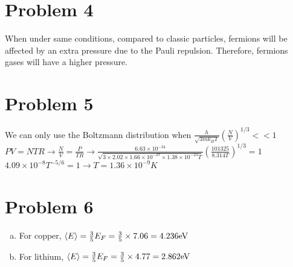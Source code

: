 \documentclass[a4paper]{article}
\begin{document}
\section{Problem 4}
\noindent When under same conditions, compared to classic particles, fermions will be affected by an extra pressure due to the Pauli repulsion. Therefore, fermions gases will have a higher pressure.
\section{Problem 5}
We can only use the Boltzmann distribution when $\frac{h}{\sqrt{3mk_BT}}(\frac{N}{V})^{1/3}<<1$
\\$PV=NTR\rightarrow\frac{N}{V}=\frac{P}{TR}\rightarrow\frac{6.63\times10^{-34}}{\sqrt{3\times2.02\times1.66\times10^{-27}\times1.38\times10^{-23}T}}(\frac{101325}{8.314T})^{1/3}=1$
\\$4.09\times10^{-8}T^{-5/6}=1\rightarrow T=1.36\times10^{-9 }K$
\section{Problem 6}
\noindent \begin{enumerate}[(a)]
    \item For copper, $\braket{E}=\frac{3}{5}E_F=\frac{3}{5}\times7.06=4.236\text{eV}$
    \item For lithium, $\braket{E}=\frac{3}{5}E_F=\frac{3}{5}\times4.77=2.862\text{eV}$
\end{enumerate}
\end{document}
